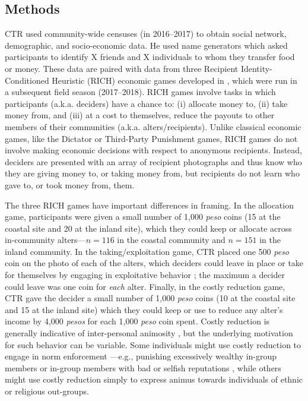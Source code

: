 \documentclass[bibauthoryear]{aa}
\begin{document}
\subsection{Methods}
CTR used community-wide censuses (in 2016--2017) to obtain social network, demographic, and socio-economic data. He used name generators which asked participants to identify X friends and X individuals to whom they transfer food or money. These data are paired with data from three Recipient Identity-Conditioned Heuristic (RICH) economic games developed in \citet{gervais2017rich}, which were run in a subsequent field season (2017--2018). RICH games involve tasks in which participants (a.k.a. deciders) have a chance to: (i) allocate money to, (ii) take money from, and (iii) at a cost to themselves, reduce the payouts to other members of their communities (a.k.a. alters/recipients). Unlike classical economic games, like the Dictator or Third-Party Punishment games, RICH games do not involve making economic decisions with respect to anonymous recipients. Instead, deciders are presented with an array of recipient photographs and thus know who they are giving money to, or taking money from, but recipients do not learn who gave to, or took money from, them. 

The three RICH games have important differences in framing. In the allocation game, participants were given a small number of 1,000 \textit{peso} coins (15 at the coastal site and 20 at the inland site), which they could keep or allocate across in-community alters---$n=116$ in the coastal community and $n=151$ in the inland community. In the taking/exploitation game, CTR placed one 500 \textit{peso} coin on the photo of each of the alters, which deciders could leave in place or take for themselves by engaging in exploitative behavior \citep{bhui2019exploitation}; the maximum a decider could leave was one coin for \textit{each} alter. Finally, in the costly reduction game, CTR gave the decider a small number of 1,000 \textit{peso} coins (10 at the coastal site and 15 at the inland site) which they could keep or use to reduce any alter's income by 4,000 \textit{pesos} for each 1,000 \textit{peso} coin spent. Costly reduction is generally indicative %
of inter-personal animosity \citep{gervais2017rich}, but the underlying motivation for such behavior can be variable. Some individuals might use costly reduction to engage in  norm enforcement \citep{Fehr2002}---e.g., punishing excessively wealthy in-group members \citep{gervais2017rich, Pisor2020} or in-group members with bad or selfish reputations \citep{bhui2019exploitation}, while others might use costly reduction simply to express animus towards individuals of ethnic or religious out-groups. %
\end{document}
